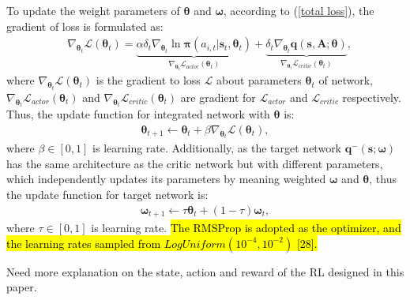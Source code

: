 \documentclass{ar2rc}
\newcommand{\highlight}[1]{\sethlcolor{yellow!50}\hl{#1}}
\begin{document}
To update the weight parameters of $\boldsymbol{\theta}$ and $\boldsymbol{\omega}$, according to (\ref{total loss}), the gradient of loss is formulated as:    %
\begin{align} \label{gradient of loss}
    & \nabla_{\boldsymbol{\theta}_t}\mathcal{L}(\boldsymbol{\theta}_t)=\underbrace{\alpha \delta_t\nabla_{\boldsymbol{\theta}_t}\ln\boldsymbol{\pi}\left(a_{i,t}|\boldsymbol{s}_t,\boldsymbol{\theta}_t \right)}_{\nabla_{\boldsymbol{\theta}_t}\mathcal{L}_{actor}(\boldsymbol{\theta}_t)}+\underbrace{\delta_t\nabla_{\boldsymbol{\theta}_t}\boldsymbol{q}\left(\boldsymbol{s}, \mathbf{A};\boldsymbol{\theta}\right)}_{\nabla_{\boldsymbol{\theta}_t}\mathcal{L}_{critic}(\boldsymbol{\theta}_t)} , \tag{27}
\end{align}
where $\nabla_{\boldsymbol{\theta}_t}\mathcal{L}(\boldsymbol{\theta}_t)$ is the gradient to loss $\mathcal{L}$ about parameters $\boldsymbol{\theta}_t$ of network, $\nabla_{\boldsymbol{\theta}_t}\mathcal{L}_{actor}(\boldsymbol{\theta}_t)$ and $\nabla_{\boldsymbol{\theta}_t}\mathcal{L}_{critic}(\boldsymbol{\theta}_t)$ are gradient for $\mathcal{L}_{actor}$ and $\mathcal{L}_{critic}$ respectively. Thus, the update function for integrated network with $\boldsymbol{\theta}$ is:
\begin{align} \label{update function of actor}
   \boldsymbol{\theta}_{t+1}\leftarrow \boldsymbol{\theta}_t+\beta \nabla_{\boldsymbol{\theta}_t}\mathcal{L}(\boldsymbol{\theta}_t), \tag{28}
\end{align}
where $\beta$$\in$$[0,1]$ is learning rate. Additionally, as the target network $\boldsymbol{q}^{-}\left(\boldsymbol{s};\boldsymbol{\omega}\right)$ has the same architecture as the critic network but with different parameters, which independently updates its parameters by meaning weighted $\boldsymbol{\omega}$ and $\boldsymbol{\theta}$, thus the update function for target network is:
\begin{align} \label{update function of critic}
   \boldsymbol{\omega}_{t+1}\leftarrow \tau \boldsymbol{\theta}_t+(1-\tau)\boldsymbol{\omega}_t, \tag{29}
\end{align}
where $\tau$$\in$$[0,1]$ is learning rate. \highlight{The RMSProp is adopted as the optimizer, and the learning rates sampled from $\mathit{LogUniform}(10^{-4}, 10^{-2})$ [28].}





\begin{tcolorbox}[
                    title={Reviewer 3: Comment 6},
                    colback=gray!10,%
                    colframe=black,%
                    width=\linewidth,%
                    arc=1mm, auto outer arc,
                    boxrule=0.5pt,
                 ]
                 Need more explanation on the state, action and reward of the RL designed in this paper.
\end{tcolorbox}
\end{document}
